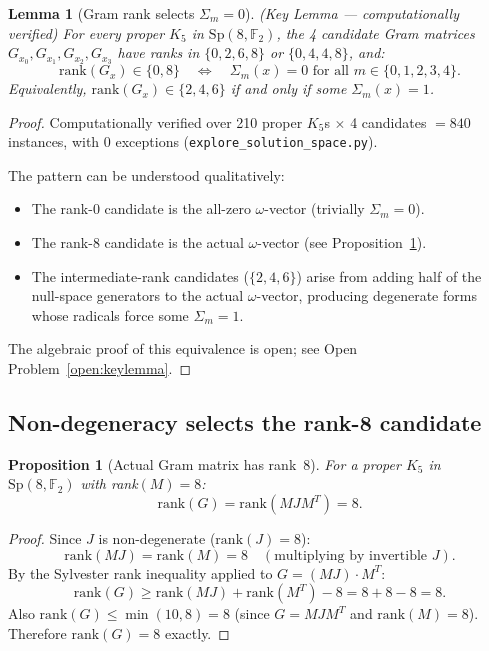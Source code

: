 \documentclass[11pt,a4paper]{article}
\newtheorem{lemma}[theorem]{Lemma}
\newtheorem{proposition}[theorem]{Proposition}
\theoremstyle{remark}
\newcommand{\Sp}{\mathrm{Sp}}
\begin{document}
\begin{lemma}[Gram rank selects $\Sigma_m = 0$]\label{lem:key}
\textup{(Key Lemma --- computationally verified)}
For every proper $K_5$ in $\Sp(8,\mathbb{F}_2)$,
the 4 candidate Gram matrices $G_{x_0}, G_{x_1}, G_{x_2}, G_{x_3}$ have
ranks in $\{0, 2, 6, 8\}$ or $\{0, 4, 4, 8\}$, and:
\[
  \mathrm{rank}(G_x) \in \{0, 8\}
  \quad \Longleftrightarrow \quad
  \Sigma_m(x) = 0 \text{ for all } m \in \{0,1,2,3,4\}.
\]
Equivalently, $\mathrm{rank}(G_x) \in \{2, 4, 6\}$ if and only if
some $\Sigma_m(x) = 1$.
\end{lemma}

\begin{proof}
Computationally verified over 210 proper $K_5$s $\times$ 4 candidates
$= 840$ instances, with 0 exceptions (\texttt{explore\_solution\_space.py}).

The pattern can be understood qualitatively:
\begin{itemize}
  \item The rank-0 candidate is the all-zero $\omega$-vector (trivially $\Sigma_m = 0$).
  \item The rank-8 candidate is the actual $\omega$-vector (see Proposition~\ref{prop:rank8gram}).
  \item The intermediate-rank candidates ($\{2,4,6\}$) arise from adding
        half of the null-space generators to the actual $\omega$-vector,
        producing degenerate forms whose radicals force some $\Sigma_m = 1$.
\end{itemize}
The algebraic proof of this equivalence is open; see Open Problem~\ref{open:keylemma}.
\end{proof}

\subsection{Non-degeneracy selects the rank-8 candidate}

\begin{proposition}[Actual Gram matrix has rank~8]\label{prop:rank8gram}
For a proper $K_5$ in $\Sp(8,\mathbb{F}_2)$ with rank$(M)=8$:
\[
  \mathrm{rank}(G) = \mathrm{rank}(MJM^T) = 8.
\]
\end{proposition}

\begin{proof}
Since $J$ is non-degenerate ($\mathrm{rank}(J) = 8$):
\[
  \mathrm{rank}(MJ) = \mathrm{rank}(M) = 8
  \quad (\text{multiplying by invertible }J).
\]
By the Sylvester rank inequality applied to $G = (MJ) \cdot M^T$:
\[
  \mathrm{rank}(G) \geq \mathrm{rank}(MJ) + \mathrm{rank}(M^T) - 8
  = 8 + 8 - 8 = 8.
\]
Also $\mathrm{rank}(G) \leq \min(10, 8) = 8$ (since $G = MJM^T$ and $\mathrm{rank}(M) = 8$).
Therefore $\mathrm{rank}(G) = 8$ exactly.
\end{proof}
\end{document}
